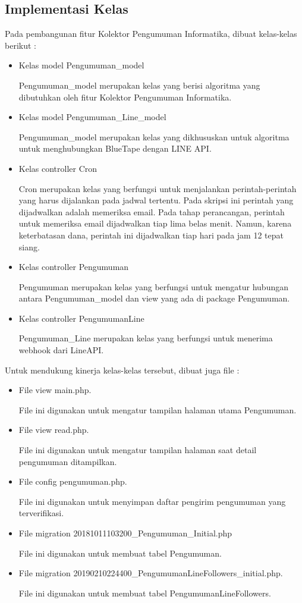 \subsection{Implementasi Kelas}
Pada pembangunan fitur Kolektor Pengumuman Informatika, dibuat kelas-kelas berikut : 
\begin{itemize}
\item Kelas model Pengumuman\_model

Pengumuman\_model merupakan kelas yang berisi algoritma yang dibutuhkan oleh fitur Kolektor Pengumuman Informatika.

\item Kelas model Pengumuman\_Line\_model

Pengumuman\_model merupakan kelas yang dikhususkan untuk algoritma untuk menghubungkan BlueTape dengan LINE API.

\item Kelas controller Cron

Cron merupakan kelas yang berfungsi untuk menjalankan perintah-perintah yang harus dijalankan pada jadwal tertentu. Pada skripsi ini perintah yang dijadwalkan adalah memeriksa email. Pada tahap perancangan, perintah untuk memeriksa email dijadwalkan tiap lima belas menit. Namun, karena keterbatasan dana, perintah ini dijadwalkan tiap hari pada jam 12 tepat siang.

\item Kelas controller Pengumuman

Pengumuman merupakan kelas yang berfungsi untuk mengatur hubungan antara Pengumuman\_model dan view yang ada di package Pengumuman.

\item Kelas controller PengumumanLine

Pengumuman\_Line merupakan kelas yang berfungsi untuk menerima webhook dari LineAPI.

\end{itemize}

Untuk mendukung kinerja kelas-kelas tersebut, dibuat juga file :
\begin{itemize}
\item File view main.php.

File ini digunakan untuk mengatur tampilan halaman utama Pengumuman.

\item File view read.php.

File ini digunakan untuk mengatur tampilan halaman saat detail pengumuman ditampilkan.

\item File config pengumuman.php.

File ini digunakan untuk menyimpan daftar pengirim pengumuman yang terverifikasi.

\item File migration 20181011103200\_Pengumuman\_Initial.php 

File ini digunakan untuk membuat tabel Pengumuman.

\item File migration 20190210224400\_PengumumanLineFollowers\_initial.php.

File ini digunakan untuk membuat tabel PengumumanLineFollowers.
\end{itemize}

